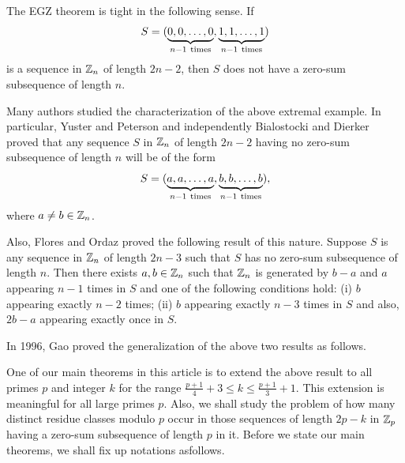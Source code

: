 \documentclass[fleqn]{mat01}
\begin{document}
The EGZ theorem is tight in the following sense. If
\begin{equation*}S = (\underbrace{0,0,
\ldots,0}_{n-1 \ {\rm times }}, \underbrace{1,1,\ldots,1}_{n-1 \ {\rm
times}})
\end{equation*}
is a sequence in ${\Bbb Z}_n$ of length $2n-2$, then $S$ does not have a
zero-sum subsequence of length $n$.

Many authors studied the characterization of the above extremal example.
In particular, Yuster and Peterson \cite{yp1} and independently
Bialostocki and Dierker \cite{bd} proved that any sequence $S$ in ${\Bbb Z}_n$
of length $2n-2$ having no zero-sum subsequence of length $n$ will be of
the form
\begin{equation*}
S = (\underbrace{a,a,\ldots,a}_{n-1 \ {\rm times }}, \underbrace{b,b,
\ldots,b}_{n-1 \ {\rm times }}),
\end{equation*}
where $a\ne b \in {\Bbb Z}_n$.

Also, Flores and Ordaz \cite{fo1} proved the following result of this
nature. Suppose $S$ is any sequence in ${\Bbb Z}_n$ of length $2n-3$ such that
$S$ has no zero-sum subsequence of length $n$. Then there exists $a, b
\in {\Bbb Z}_n$ such that ${\Bbb Z}_n$ is generated by $b-a$ and $a$ appearing $n-1$
times in $S$ and one of the following conditions hold: (i) $b$
appearing exactly $n-2$ times; (ii) $b$ appearing exactly $n-3$ times in
$S$ and also, $2b -a$ appearing exactly once in $S$.

In 1996, Gao \cite{gao10} proved the generalization of the above two
results as follows.\vspace{.7pc}


One of our main theorems in this article is to extend the above result
to all primes $p$ and integer $k$ for the range $\frac{p+1}4+3\leq k
\leq \frac{p+1}3+1$. This extension is meaningful for all large primes
$p$. Also, we shall study the problem of how many distinct residue
classes modulo $p$ occur in those sequences of length $2p-k$ in ${\Bbb Z}_p$
having a zero-sum subsequence of length $p$ in it. Before we state our
main theorems, we shall fix up notations as\break follows.
\end{document}
